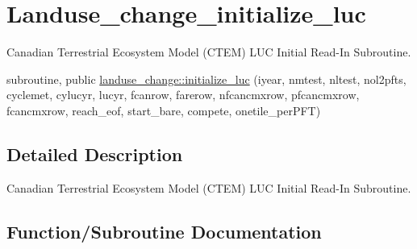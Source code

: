\hypertarget{group__landuse__change__initialize__luc}{}\section{Landuse\+\_\+change\+\_\+initialize\+\_\+luc}
\label{group__landuse__change__initialize__luc}


Canadian Terrestrial Ecosystem Model (C\+T\+E\+M) L\+U\+C Initial Read-\/\+In Subroutine.  


\begin{DoxyCompactItemize}
\item 
subroutine, public \hyperlink{group__landuse__change__initialize__luc_gaba5d08f48edbf30aa51b5b4afd03ddfb}{landuse\+\_\+change\+::initialize\+\_\+luc} (iyear, nmtest, nltest, nol2pfts, cyclemet, cylucyr, lucyr, fcanrow, farerow, nfcancmxrow, pfcancmxrow, fcancmxrow, reach\+\_\+eof, start\+\_\+bare, compete, onetile\+\_\+per\+P\+F\+T)
\end{DoxyCompactItemize}


\subsection{Detailed Description}
Canadian Terrestrial Ecosystem Model (C\+T\+E\+M) L\+U\+C Initial Read-\/\+In Subroutine. 



\subsection{Function/\+Subroutine Documentation}
\hypertarget{group__landuse__change__initialize__luc_gaba5d08f48edbf30aa51b5b4afd03ddfb}{}
